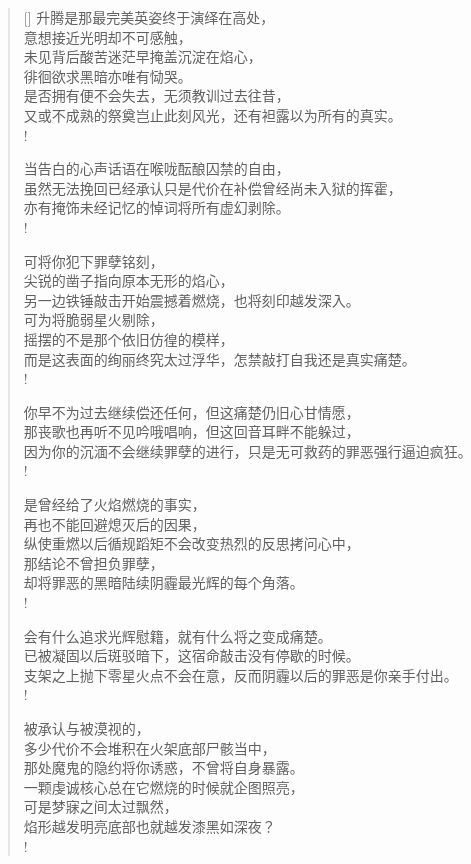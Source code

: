 \documentclass[UTF8, 12pt, a4paper]{ctexrep} %
\begin{document}
\begin{verse}[\versewidth]
升腾是那最完美英姿终于演绎在高处，\\
意想接近光明却不可感触，\\
未见背后酸苦迷茫早掩盖沉淀在焰心，\\
徘徊欲求黑暗亦唯有恸哭。\\
是否拥有便不会失去，无须教训过去往昔，\\
又或不成熟的祭奠岂止此刻风光，还有袒露以为所有的真实。\\!

当告白的心声话语在喉咙酝酿囚禁的自由，\\
虽然无法挽回已经承认只是代价在补偿曾经尚未入狱的挥霍，\\
亦有掩饰未经记忆的悼词将所有虚幻剥除。\\!

可将你犯下罪孽铭刻，\\
尖锐的凿子指向原本无形的焰心，\\
另一边铁锤敲击开始震撼着燃烧，也将刻印越发深入。\\
可为将脆弱星火剔除，\\
摇摆的不是那个依旧仿徨的模样，\\
而是这表面的绚丽终究太过浮华，怎禁敲打自我还是真实痛楚。\\!

你早不为过去继续偿还任何，但这痛楚仍旧心甘情愿，\\
那丧歌也再听不见吟哦唱响，但这回音耳畔不能躲过，\\
因为你的沉湎不会继续罪孽的进行，只是无可救药的罪恶强行逼迫疯狂。\\!

是曾经给了火焰燃烧的事实，\\
再也不能回避熄灭后的因果，\\
纵使重燃以后循规蹈矩不会改变热烈的反思拷问心中，\\
那结论不曾担负罪孽，\\
却将罪恶的黑暗陆续阴霾最光辉的每个角落。\\!

会有什么追求光辉慰籍，就有什么将之变成痛楚。\\
已被凝固以后斑驳暗下，这宿命敲击没有停歇的时候。\\
支架之上抛下零星火点不会在意，反而阴霾以后的罪恶是你亲手付出。\\!

被承认与被漠视的，\\
多少代价不会堆积在火架底部尸骸当中，\\
那处魔鬼的隐约将你诱惑，不曾将自身暴露。\\
一颗虔诚核心总在它燃烧的时候就企图照亮，\\
可是梦寐之间太过飘然，\\
焰形越发明亮底部也就越发漆黑如深夜？\\!


\end{verse}
\end{document}
